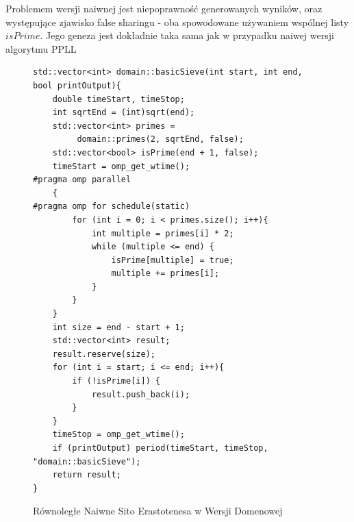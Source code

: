\documentclass{article}
\begin{document}
                    Problemem wersji naiwnej jest niepoprawność generowanych wyników, oraz występujące zjawisko false sharingu - oba spowodowane używaniem wspólnej listy $isPrime$. Jego geneza jest dokładnie taka sama jak w przypadku naiwej wersji algorytmu \gls{PPLL}
                    \begin{figure}
                        \begin{verbatim}
std::vector<int> domain::basicSieve(int start, int end, bool printOutput){
    double timeStart, timeStop;
    int sqrtEnd = (int)sqrt(end);
    std::vector<int> primes =
         domain::primes(2, sqrtEnd, false);
    std::vector<bool> isPrime(end + 1, false);
    timeStart = omp_get_wtime();
#pragma omp parallel 
    {
#pragma omp for schedule(static)
        for (int i = 0; i < primes.size(); i++){
            int multiple = primes[i] * 2;
            while (multiple <= end) {
                isPrime[multiple] = true;
                multiple += primes[i];
            }
        }
    }
    int size = end - start + 1;
    std::vector<int> result;
    result.reserve(size);
    for (int i = start; i <= end; i++){
        if (!isPrime[i]) {
            result.push_back(i);
        }
    }
    timeStop = omp_get_wtime();
    if (printOutput) period(timeStart, timeStop, "domain::basicSieve");
    return result;
}
                        \end{verbatim}
                        \caption{Równoległe Naiwne Sito Erastotenesa w Wersji Domenowej}
                    \end{figure}
                    
\end{document}
